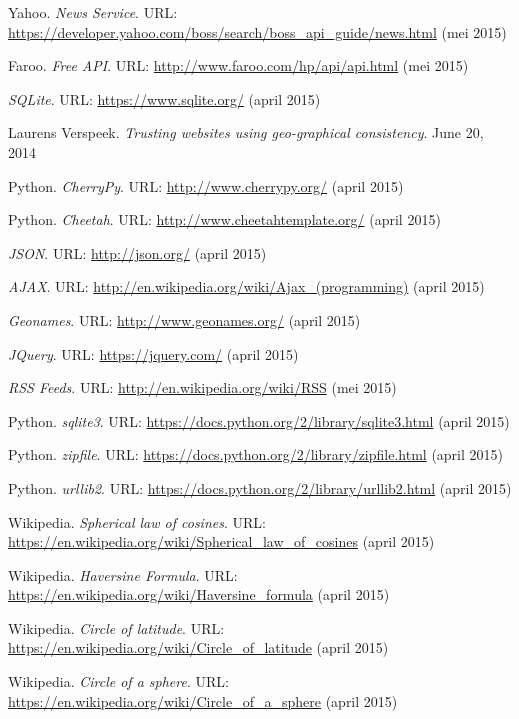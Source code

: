 \documentclass[twoside,openright]{uva-bachelor-thesis}
\begin{document}
\begin{thebibliography}{9}
	Yahoo.
	\textit{News Service}.
	URL: \url{https://developer.yahoo.com/boss/search/boss_api_guide/news.html}
	(mei 2015)
	
	Faroo.
	\textit{Free API}.
	URL: \url{http://www.faroo.com/hp/api/api.html}
	(mei 2015)
	
	\textit{SQLite}. 
	URL: \url{https://www.sqlite.org/}
	(april 2015)
	
	Laurens Verspeek. 
	\textit{Trusting websites using geo-graphical consistency}.
	June 20, 2014
	
	Python.
	\textit{CherryPy}.
	URL: \url{http://www.cherrypy.org/}
	(april 2015)
	
	Python.
	\textit{Cheetah}.
	URL: \url{http://www.cheetahtemplate.org/}
	(april 2015)
	
	\textit{JSON}.
	URL: \url{http://json.org/}
	(april 2015)
	
	\textit{AJAX}.
	URL: \url{http://en.wikipedia.org/wiki/Ajax_(programming)}
	(april 2015)
	
	\textit{Geonames}.
	URL: \url{http://www.geonames.org/}
	(april 2015)
	
	\textit{JQuery}.
	URL: \url{https://jquery.com/}
	(april 2015)
	
	\textit{RSS Feeds}.
	URL: \url{http://en.wikipedia.org/wiki/RSS}
	(mei 2015)
	
	Python.
	\textit{sqlite3}.
	URL: \url{https://docs.python.org/2/library/sqlite3.html}
	(april 2015)
	
	Python.
	\textit{zipfile}.
	URL: \url{https://docs.python.org/2/library/zipfile.html}
	(april 2015)
	
	Python.
	\textit{urllib2}.
	URL: \url{https://docs.python.org/2/library/urllib2.html}
	(april 2015)
	
	Wikipedia.
	\textit{Spherical law of cosines}.
	URL: \url{https://en.wikipedia.org/wiki/Spherical_law_of_cosines}
	(april 2015)
	
	Wikipedia.
	\textit{Haversine Formula}.
	URL: \url{https://en.wikipedia.org/wiki/Haversine_formula}
	(april 2015)
	
	Wikipedia.
	\textit{Circle of latitude}.
	URL: \url{https://en.wikipedia.org/wiki/Circle_of_latitude}
	(april 2015)
	
	Wikipedia.
	\textit{Circle of a sphere}.
	URL: \url{https://en.wikipedia.org/wiki/Circle_of_a_sphere}
	(april 2015)
	

\end{thebibliography}
\end{document}
